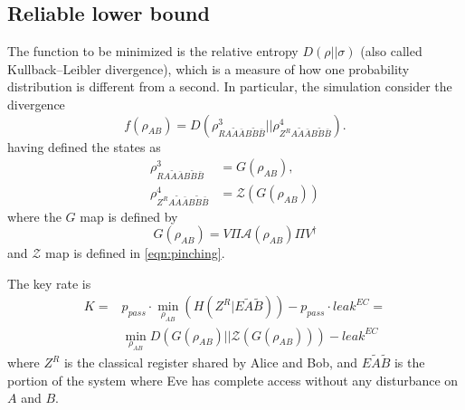 \documentclass{article}
\begin{document}
    \subsection{Reliable lower bound}   
    The function to be minimized is the relative entropy \(D(\rho||\sigma)\) (also called Kullback–Leibler divergence), which is a measure of how one probability distribution is different from a second.
    In particular, the simulation consider the divergence
    \begin{equation}
        f(\rho_{AB}) = D\left(\rho^3_{RA\tilde{A}\bar{A}B\tilde{B}\bar{B}}\big\vert\big\vert\rho^4_{Z^RA\tilde{A}\bar{A}B\tilde{B}\bar{B}}\right).
        \label{eqn:relative-entropy}
    \end{equation}
    having defined the states as
    \begin{align*}
        \rho^3_{RA\tilde{A}\bar{A}B\tilde{B}\bar{B}} &= G(\rho_{AB}),\\
        \rho^4_{Z^RA\tilde{A}\bar{A}B\tilde{B}\bar{B}} &= \mathcal{Z}(G(\rho_{AB}))
    \end{align*}
    where the \(G\) map is defined by
    \[G(\rho_{AB}) = V\Pi \mathcal{A}(\rho_{AB})\Pi V^{\dagger}\]
    and \(\mathcal{Z}\) map is defined in \eqref{eqn:pinching}.

    The key rate is
    \begin{align}
        K =& p_{pass} \cdot \min_{\rho_{AB}}\left( H(Z^R | E\tilde{A}\tilde{B})\right)-p_{pass}\cdot leak^{EC} =\nonumber\\
        & \min_{\rho_{AB}} D\left( G(\rho_{AB}) ||\mathcal{Z}(G(\rho_{AB}))\right) - leak^{EC}
        \label{eqn:key-rate}
    \end{align}
    where \(Z^R\) is the classical register shared by Alice and Bob, and \(E\tilde{A}\tilde{B}\) is the portion of the system where Eve has complete access without any disturbance on \(A\) and \(B\).
\end{document}
